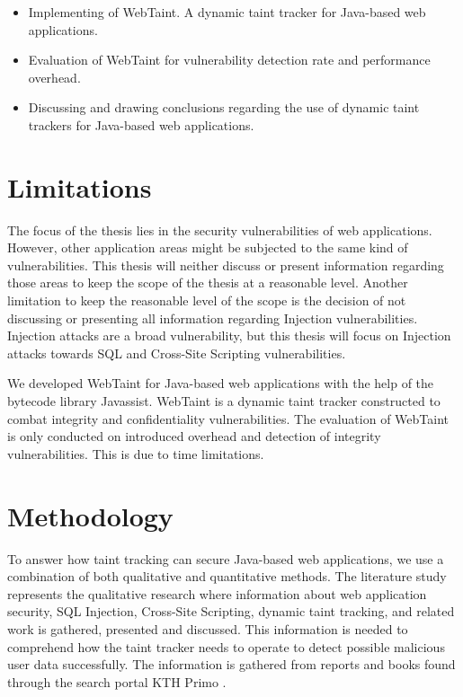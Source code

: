 \begin{itemize}  
    \item Implementing of WebTaint. A dynamic taint tracker for Java-based web applications.
    \item Evaluation of WebTaint for vulnerability detection rate and performance overhead.
    \item Discussing and drawing conclusions regarding the use of dynamic taint trackers for Java-based web applications.
\end{itemize}



\section{Limitations}
\label{Delimitations}
The focus of the thesis lies in the security vulnerabilities of web applications. However, other application areas might be subjected to the same kind of vulnerabilities. This thesis will neither discuss or present information regarding those areas to keep the scope of the thesis at a reasonable level. Another limitation to keep the reasonable level of the scope is the decision of not discussing or presenting all information regarding Injection vulnerabilities. Injection attacks are a broad vulnerability, but this thesis will focus on Injection attacks towards SQL and Cross-Site Scripting vulnerabilities.

We developed WebTaint for Java-based web applications with the help of the bytecode library Javassist. WebTaint is a dynamic taint tracker constructed to combat integrity and confidentiality vulnerabilities. The evaluation of WebTaint is only conducted on introduced overhead and detection of integrity vulnerabilities. This is due to time limitations.



\section{Methodology}
\label{Methodology}
To answer how taint tracking can secure Java-based web applications, we use a combination of both qualitative and quantitative methods. The literature study represents the qualitative research where information about web application security, SQL Injection, Cross-Site Scripting, dynamic taint tracking, and related work is gathered, presented and discussed. This information is needed to comprehend how the taint tracker needs to operate to detect possible malicious user data successfully. The information is gathered from reports and books found through the search portal KTH Primo \parencite{primo}.

